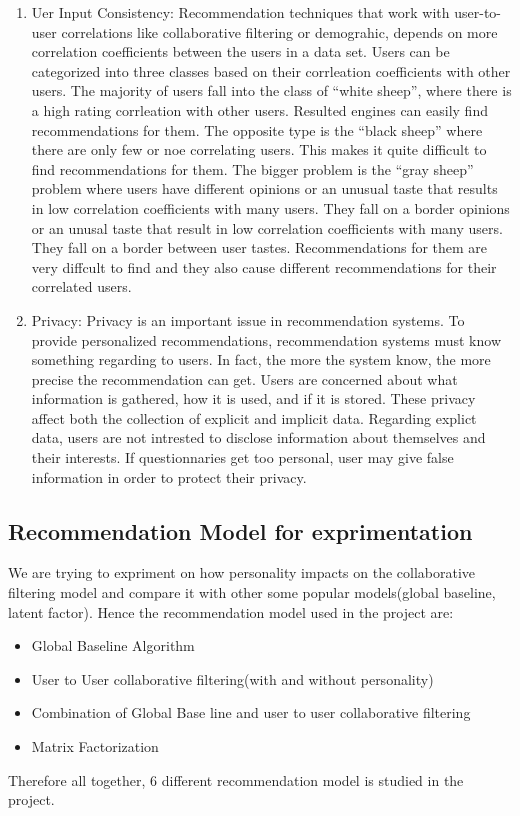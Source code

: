 \begin{enumerate}
\item Uer Input Consistency: Recommendation techniques that work with user-to-user correlations like collaborative filtering or demograhic, depends on more correlation coefficients between the users in a data set. Users can be categorized into three classes based on their corrleation coefficients with other users. The majority of users fall into the class of ``white sheep'', where there is a high rating corrleation with other users. Resulted engines can easily find recommendations for them. The opposite type is the ``black sheep'' where there are only few or noe correlating users. This makes it quite difficult to find recommendations for them. The bigger problem is the ``gray sheep'' problem where users have different opinions or an unusual taste that results in low correlation coefficients with many users. They fall on a border opinions or an unusal taste that result in low correlation coefficients with many users. They fall on a border between user tastes. Recommendations for them are very diffcult to find and they also cause different recommendations for their correlated users.
\item Privacy: Privacy is an important issue in recommendation systems. To provide personalized recommendations, recommendation systems must know something regarding to users. In fact, the more the system know, the more precise the recommendation can get. Users are concerned about what information is gathered, how it is used, and if it is stored. These privacy affect both the collection of explicit and implicit data. Regarding explict data, users are not intrested to disclose information about themselves and their interests. If questionnaries get too personal, user may give false information in order to protect their privacy.
\end{enumerate}
\subsection{Recommendation Model for exprimentation}
We are trying to expriment on how personality impacts on the collaborative filtering model and compare it with other some popular models(global baseline, latent factor).
Hence the recommendation model used in the project are:
\begin{itemize}
\item Global Baseline Algorithm
\item User to User collaborative filtering(with and without personality)
\item Combination of Global Base line and user to user collaborative filtering
\item Matrix Factorization
\end{itemize}
Therefore all together, 6 different recommendation model is studied in the project.
